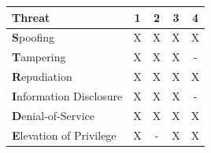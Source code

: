 \begin{table}[h!]
\centering
 \begin{tabular}{|l|c|c|c|c|} 
 \hline
 \textbf{Threat} & 1 & 2 & 3 & 4 \\
 \hline
 \textbf{S}poofing & X & X & X & X \\ 
 \hline
 \textbf{T}ampering & X & X & X & - \\
 \hline
 \textbf{R}epudiation & X & X & X & X \\
 \hline
 \textbf{I}nformation Disclosure & X & X & X & - \\
 \hline
 \textbf{D}enial-of-Service & X & X & X & X \\
 \hline
 \textbf{E}levation of Privilege & X & - & X & X \\
 \hline
 \end{tabular}
\end{table}

    
        
    